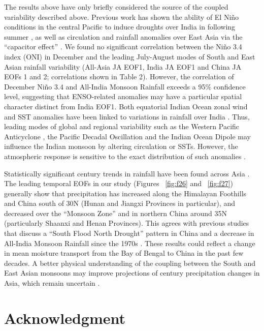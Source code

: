 	The results above have only briefly considered the source of the coupled variability described above. Previous work has shown the ability of El Ni\~no conditions in the central Pacific to induce droughts over India in following summer \citep{Kumar2006}, as well as circulation and rainfall anomalies over East Asia via the ``capacitor effect'' \citep{Xie2009}. We found no significant correlation between the Ni\~no 3.4 index (ONI) in December and the leading July-August modes of South and East Asian rainfall variability (All-Asia JA EOF1, India JA EOF1 and China JA EOFs 1 and 2; correlations shown in Table 2). However, the correlation of December Ni\~no 3.4 and All-India Monsoon Rainfall exceeds a 95\% confidence level, suggesting that ENSO-related anomalies may have a particular spatial character distinct from India EOF1. Both equatorial Indian Ocean zonal wind and SST anomalies have been linked to variations in rainfall over India \citep{Ihara2007,Mishra2012}. Thus, leading modes of global and regional variability such as the Western Pacific Anticyclone \citep{Kosaka2011}, the Pacific Decadal Oscillation \citep{Mantua2002} and the Indian Ocean Dipole \citep{Saji1999} may influence the Indian monsoon by altering circulation or SSTs. However, the atmospheric response is sensitive to the exact distribution of such anomalies \citep{Xie2009}.
	
	Statistically significant  century trends in rainfall have been found across Asia \citep{Christensen2011,Singh2014}. The leading temporal EOFs in our study (Figures ~\ref{fig:f26} and ~\ref{fig:f27}) generally show that precipitation has increased along the Himalayan Foothills and China south of 30\textdegree N (Hunan and Jiangxi Provinces in particular), and decreased over the ``Monsoon Zone'' and in northern China around 35\textdegree N (particularly Shaanxi and Henan Provinces). This agrees with previous studies that discuss a ``South Flood North Drought'' pattern in China \citep{Ding2008} and a decrease in All-India Monsoon Rainfall since the 1970s \citep{Annamalai2013}. These results could reflect a change in mean moisture transport from the Bay of Bengal to China in the past few decades. A better physical understanding of the coupling between the South and East Asian monsoons may improve projections of  century precipitation changes in Asia, which remain uncertain \citep{Christensen2011}.
	
\section{Acknowledgment} 

